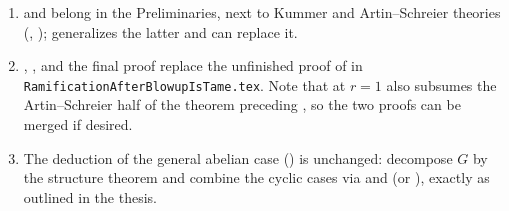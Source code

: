 \documentclass[11pt]{article}
\begin{document}
\begin{rem*}
\begin{enumerate}
  \item {} and  belong in the Preliminaries,
        next to Kummer and Artin--Schreier theories
        (,
        );
         generalizes the latter and can replace it.
  \item {}, ,
         and the final proof
        replace the unfinished proof of
         in
        \texttt{RamificationAfterBlowupIsTame.tex}.  Note that
         at $r=1$ also subsumes the Artin--Schreier half
        of the theorem preceding
        , so the two proofs
        can be merged if desired.
  \item The deduction of the general abelian case
        () is unchanged:
        decompose $G$ by the structure theorem and combine the cyclic
        cases via  and
         (or
        ), exactly as outlined
        in the thesis.
\end{enumerate}
\end{rem*}

\printbibliography
\end{document}
